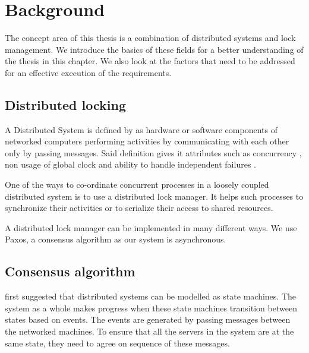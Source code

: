 \chapter{Background}
\label{chapter:background}

The concept area of this thesis is a combination of distributed systems and lock
management. We introduce the basics of these fields for a better
understanding of the thesis in this chapter. We also look at the factors that
need to be addressed for an effective execution of the requirements.

\section{Distributed locking}

A Distributed System is defined by \citet[]{coulouris2005distributed} as 
hardware or software components of networked computers performing activities by
communicating with each other only by passing messages. Said definition gives
it attributes such as concurrency%
, non usage of global clock%
and ability to handle independent failures
.

One of the ways to co-ordinate concurrent processes in a loosely coupled 
distributed system is to use a distributed lock manager. It helps such
processes to synchronize their activities or to serialize their access to
shared resources.

A distributed lock manager can be implemented in many different ways. We use
Paxos, a consensus algorithm as our system is asynchronous.

\section{Consensus algorithm}

\citet{Lamclocks} first suggested that distributed systems can be modelled as
state machines. The system as a whole makes progress when these state machines
transition between states based on events. The events are  generated by passing
messages between the networked machines. To ensure that all the servers in the
system are at the same state, they need to agree on sequence of these messages.

